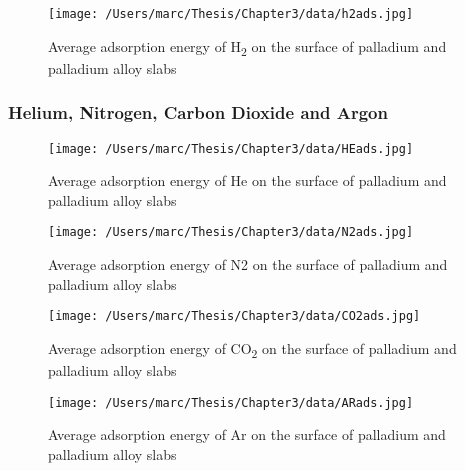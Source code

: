\begin{landscape}
\begin{figure}
    \centering
    \texttt{[image: /Users/marc/Thesis/Chapter3/data/h2ads.jpg]}
    \caption{Average adsorption energy of H\textsubscript{2} on the surface of palladium and palladium alloy slabs}
    \label{h2ads}
  \end{figure}

\end{landscape}
\subsubsection{Helium, Nitrogen, Carbon Dioxide and Argon}

\begin{landscape}
  \begin{figure}
      \centering
      \texttt{[image: /Users/marc/Thesis/Chapter3/data/HEads.jpg]}
      \caption{Average adsorption energy of He on the surface of palladium and palladium alloy slabs}
      \label{heads}
    \end{figure}
  
  \end{landscape}

  \begin{landscape}
    \begin{figure}
        \centering
        \texttt{[image: /Users/marc/Thesis/Chapter3/data/N2ads.jpg]}
        \caption{Average adsorption energy of N2 on the surface of palladium and palladium alloy slabs}
        \label{n2ads}
      \end{figure}
    
    \end{landscape}


\begin{landscape}
    \begin{figure}
        \centering
        \texttt{[image: /Users/marc/Thesis/Chapter3/data/CO2ads.jpg]}
        \caption{Average adsorption energy of CO\textsubscript{2} on the surface of palladium and palladium alloy slabs}
        \label{co2ads}
      \end{figure}
    
    \end{landscape}

    \begin{landscape}
        \begin{figure}
            \centering
            \texttt{[image: /Users/marc/Thesis/Chapter3/data/ARads.jpg]}
            \caption{Average adsorption energy of Ar on the surface of palladium and palladium alloy slabs}
            \label{Arads}
          \end{figure}
        
        \end{landscape}
